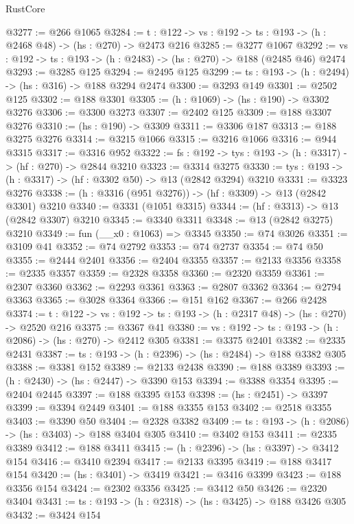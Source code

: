 \begin{lexlean}{RustCore}
\begin{coremodule}
@3277 := @266 @1065
@3284 := {t : @122} -> {vs : @192} -> {ts : @193} -> (h : @2468 @48) -> (hs : @270) -> @2473 @216
@3285 := @3277 @1067
@3292 := {vs : @192} -> {ts : @193} -> (h : @2483) -> (hs : @270) -> @188 (@2485 @46) @2474
@3293 := @3285 @125
@3294 := @2495 @125
@3299 := {ts : @193} -> (h : @2494) -> (hs : @316) -> @188 @3294 @2474
@3300 := @3293 @149
@3301 := @2502 @125
@3302 := @188 @3301
@3305 := (h : @1069) -> (hs : @190) -> @3302 @3276
@3306 := @3300 @3273
@3307 := @2402 @125
@3309 := @188 @3307 @3276
@3310 := (hs : @190) -> @3309
@3311 := @3306 @187
@3313 := @188 @3275 @3276
@3314 := @3215 @1066
@3315 := @3216 @1066
@3316 := @944 @3315
@3317 := @3316 @952
@3322 := {fs : @192} -> {tys : @193} -> (h : @3317) -> (hf : @270) -> @2844 @3210
@3323 := @3314 @3275
@3330 := {tys : @193} -> (h : @3317) -> (hf : @3302 @50) -> @13 (@2842 @3294) @3210
@3331 := @3323 @3276
@3338 := (h : @3316 (@951 @3276)) -> (hf : @3309) -> @13 (@2842 @3301) @3210
@3340 := @3331 (@1051 @3315)
@3344 := (hf : @3313) -> @13 (@2842 @3307) @3210
@3345 := @3340 @3311
@3348 := @13 (@2842 @3275) @3210
@3349 := fun (__x0 : @1063) => @3345
@3350 := @74 @3026
@3351 := @3109 @41
@3352 := @74 @2792
@3353 := @74 @2737
@3354 := @74 @50
@3355 := @2444 @2401
@3356 := @2404 @3355
@3357 := @2133 @3356
@3358 := @2335 @3357
@3359 := @2328 @3358
@3360 := @2320 @3359
@3361 := @2307 @3360
@3362 := @2293 @3361
@3363 := @2807 @3362
@3364 := @2794 @3363
@3365 := @3028 @3364
@3366 := @151 @162
@3367 := @266 @2428
@3374 := {t : @122} -> {vs : @192} -> {ts : @193} -> (h : @2317 @48) -> (hs : @270) -> @2520 @216
@3375 := @3367 @41
@3380 := {vs : @192} -> {ts : @193} -> (h : @2086) -> (hs : @270) -> @2412 @305
@3381 := @3375 @2401
@3382 := @2335 @2431
@3387 := {ts : @193} -> (h : @2396) -> (hs : @2484) -> @188 @3382 @305
@3388 := @3381 @152
@3389 := @2133 @2438
@3390 := @188 @3389
@3393 := (h : @2430) -> (hs : @2447) -> @3390 @153
@3394 := @3388 @3354
@3395 := @2404 @2445
@3397 := @188 @3395 @153
@3398 := (hs : @2451) -> @3397
@3399 := @3394 @2449
@3401 := @188 @3355 @153
@3402 := @2518 @3355
@3403 := @3390 @50
@3404 := @2328 @3382
@3409 := {ts : @193} -> (h : @2086) -> (hs : @3403) -> @188 @3404 @305
@3410 := @3402 @153
@3411 := @2335 @3389
@3412 := @188 @3411
@3415 := (h : @2396) -> (hs : @3397) -> @3412 @154
@3416 := @3410 @2394
@3417 := @2133 @3395
@3419 := @188 @3417 @154
@3420 := (hs : @3401) -> @3419
@3421 := @3416 @3399
@3423 := @188 @3356 @154
@3424 := @2302 @3356
@3425 := @3412 @50
@3426 := @2320 @3404
@3431 := {ts : @193} -> (h : @2318) -> (hs : @3425) -> @188 @3426 @305
@3432 := @3424 @154

\end{coremodule}
\end{lexlean}
